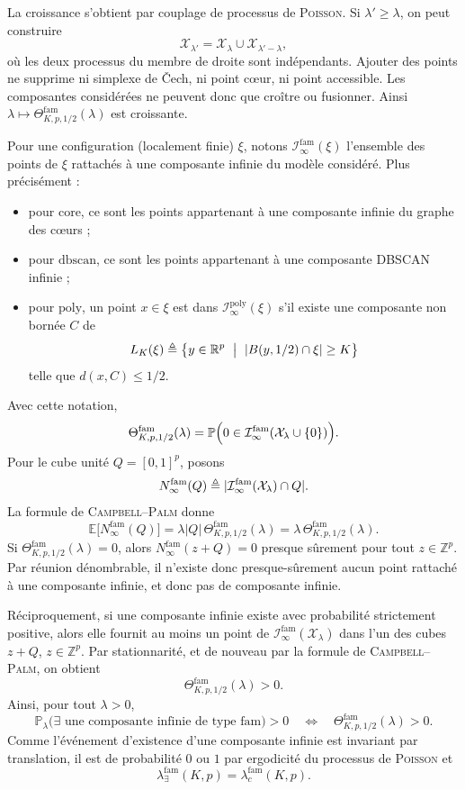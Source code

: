 \begin{Preuve}
La croissance s'obtient par couplage de processus de \textsc{Poisson}.
Si $\lambda'\geq\lambda$, on peut construire
\[
\mathcal X_{\lambda'}=\mathcal X_{\lambda}\cup
\mathcal X_{\lambda'-\lambda},
\]
où les deux processus du membre de droite sont indépendants. Ajouter des points ne supprime ni simplexe de \v{C}ech, ni point cœur, ni point accessible.
Les composantes considérées ne peuvent donc que croître ou fusionner. Ainsi
$\lambda\mapsto\Theta^{\mathrm{fam}}_{K,p,1/2}(\lambda)$ est croissante.

Pour une configuration (localement finie) $\xi$, notons $\mathcal I_{\infty}^{\mathrm{fam}}(\xi)$ l'ensemble des points de $\xi$ rattachés à une composante infinie du modèle considéré. Plus précisément :
\begin{itemize}
    \item pour $\mathrm{core}$, ce sont les points appartenant à une composante infinie du graphe des cœurs ;
    \item pour $\mathrm{dbscan}$, ce sont les points appartenant à une composante DBSCAN infinie ;
    \item pour $\mathrm{poly}$, un point $x\in\xi$ est dans $\mathcal I_{\infty}^{\mathrm{poly}}(\xi)$ s'il existe une composante non bornée $C$ de
    \[
    L_K(\xi) \eqdef \bigl\{y\in\mathbb R^p \ \bigm| \ |B(y,1/2)\cap \xi|\geq K\bigr\}
    \]
    telle que $d(x,C)\leq 1/2$.
\end{itemize}
Avec cette notation,
\[
\Theta^{\mathrm{fam}}_{K,p,1/2}(\lambda)
=
\mathbb P\Bigl(
0\in
\mathcal I_{\infty}^{\mathrm{fam}}
(\mathcal X_{\lambda}\cup\{0\})
\Bigr).
\]
Pour le cube unité $Q=[0,1]^p$, posons
\[
N_{\infty}^{\mathrm{fam}}(Q)
\triangleq
\lvert 
\mathcal I_{\infty}^{\mathrm{fam}}(\mathcal X_{\lambda})
\cap Q
 \rvert.
\]
La formule de \textsc{Campbell--Palm} donne
\[
\mathbb E\bigl[N_{\infty}^{\mathrm{fam}}(Q)\bigr]
=
\lambda |Q|\,
\Theta^{\mathrm{fam}}_{K,p,1/2}(\lambda)
=
\lambda\,
\Theta^{\mathrm{fam}}_{K,p,1/2}(\lambda).
\]
Si
$\Theta^{\mathrm{fam}}_{K,p,1/2}(\lambda)=0$, alors
$N_{\infty}^{\mathrm{fam}}(z+Q)=0$ presque sûrement pour tout
$z\in\mathbb Z^p$. Par réunion dénombrable, il n'existe donc presque-sûrement aucun point rattaché à une composante infinie, et donc pas de composante infinie.

Réciproquement, si une composante infinie existe avec probabilité strictement positive, alors elle fournit au moins un point de $\mathcal I_{\infty}^{\mathrm{fam}}(\mathcal X_{\lambda})$ dans l'un des cubes $z+Q$, $z\in\mathbb Z^p$. Par stationnarité, et de nouveau par la formule de \textsc{Campbell--Palm}, on obtient
\[
\Theta^{\mathrm{fam}}_{K,p,1/2}(\lambda)>0.
\]
Ainsi, pour tout $\lambda>0$,
\[
\mathbb P_{\lambda}\bigl(
\exists\text{ une composante infinie de type }\mathrm{fam}
\bigr)>0
\quad\Longleftrightarrow\quad
\Theta^{\mathrm{fam}}_{K,p,1/2}(\lambda)>0.
\]
Comme l'événement d'existence d'une composante infinie est invariant par
translation, il est de probabilité $0$ ou $1$ par ergodicité du processus de \textsc{Poisson} et
\[
\lambda^{\mathrm{fam}}_{\exists}(K,p)
=
\lambda^{\mathrm{fam}}_{c}(K,p).
\]


\end{Preuve}
